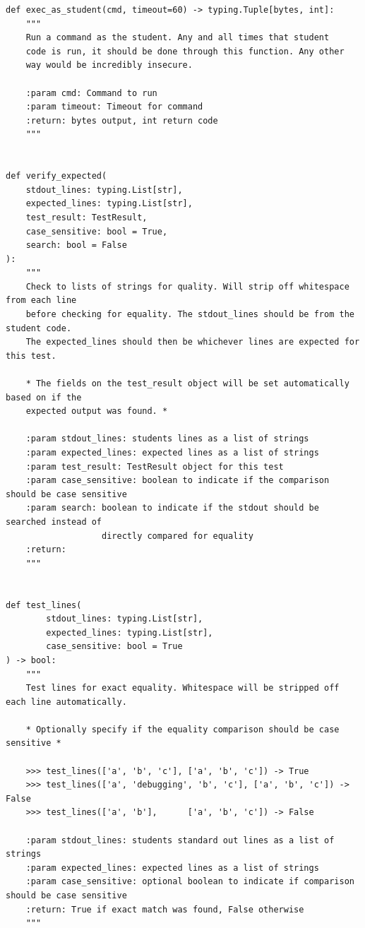 \begin{verbatim}
def exec_as_student(cmd, timeout=60) -> typing.Tuple[bytes, int]:
    """
    Run a command as the student. Any and all times that student
    code is run, it should be done through this function. Any other
    way would be incredibly insecure.

    :param cmd: Command to run
    :param timeout: Timeout for command
    :return: bytes output, int return code
    """


def verify_expected(
    stdout_lines: typing.List[str],
    expected_lines: typing.List[str],
    test_result: TestResult,
    case_sensitive: bool = True,
    search: bool = False
):
    """
    Check to lists of strings for quality. Will strip off whitespace from each line
    before checking for equality. The stdout_lines should be from the student code.
    The expected_lines should then be whichever lines are expected for this test.

    * The fields on the test_result object will be set automatically based on if the
    expected output was found. *

    :param stdout_lines: students lines as a list of strings
    :param expected_lines: expected lines as a list of strings
    :param test_result: TestResult object for this test
    :param case_sensitive: boolean to indicate if the comparison should be case sensitive
    :param search: boolean to indicate if the stdout should be searched instead of
                   directly compared for equality
    :return:
    """


def test_lines(
        stdout_lines: typing.List[str],
        expected_lines: typing.List[str],
        case_sensitive: bool = True
) -> bool:
    """
    Test lines for exact equality. Whitespace will be stripped off each line automatically.

    * Optionally specify if the equality comparison should be case sensitive *

    >>> test_lines(['a', 'b', 'c'], ['a', 'b', 'c']) -> True
    >>> test_lines(['a', 'debugging', 'b', 'c'], ['a', 'b', 'c']) -> False
    >>> test_lines(['a', 'b'],      ['a', 'b', 'c']) -> False

    :param stdout_lines: students standard out lines as a list of strings
    :param expected_lines: expected lines as a list of strings
    :param case_sensitive: optional boolean to indicate if comparison should be case sensitive
    :return: True if exact match was found, False otherwise
    """



\end{verbatim}
